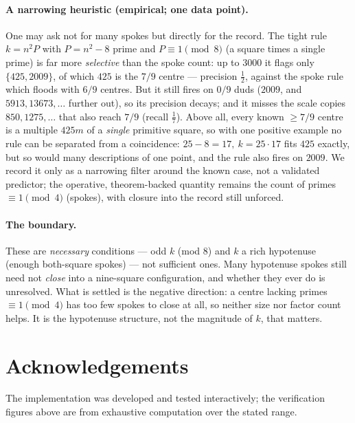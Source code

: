 \documentclass[11pt]{article}
\theoremstyle{definition}
\begin{document}
\paragraph{A narrowing heuristic (empirical; one data point).} One may ask not for many
spokes but directly for the record. The tight rule $k=n^2P$ with $P=n^2-8$ prime and
$P\equiv1\pmod8$ (a square times a single prime) is far more \emph{selective} than the spoke
count: up to $3000$ it flags only $\{425,2009\}$, of which $425$ is the $7/9$ centre ---
precision $\tfrac12$, against the spoke rule which floods with $6/9$ centres. But it still
fires on $0/9$ duds ($2009$, and $5913,13673,\dots$ further out), so its precision decays;
and it misses the scale copies $850,1275,\dots$ that also reach $7/9$ (recall $\tfrac17$).
Above all, every known $\ge7/9$ centre is a multiple $425m$ of a \emph{single} primitive
square, so with one positive example no rule can be separated from a coincidence:
$25-8=17,\ k=25\cdot17$ fits $425$ exactly, but so would many descriptions of one point, and
the rule also fires on $2009$. We record it only as a narrowing filter around the known case,
not a validated predictor; the operative, theorem-backed quantity remains the count of primes
$\equiv1\pmod4$ (spokes), with closure into the record still unforced.

\paragraph{The boundary.} These are \emph{necessary} conditions --- odd $k$ (mod $8$) and
$k$ a rich hypotenuse (enough both-square spokes) --- not sufficient ones. Many hypotenuse
spokes still need not \emph{close} into a nine-square configuration, and whether they ever do
is unresolved. What is settled is the negative direction: a centre lacking primes
$\equiv1\pmod4$ has too few spokes to close at all, so neither size nor factor count helps.
It is the hypotenuse structure, not the magnitude of $k$, that matters.

\section*{Acknowledgements}

The implementation was developed and tested interactively; the verification
figures above are from exhaustive computation over the stated range.
\end{document}
